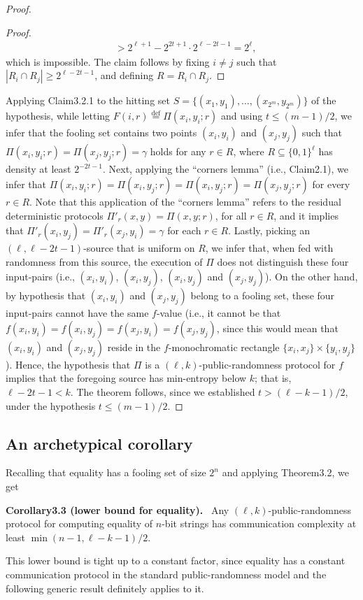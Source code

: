 \documentclass[10pt,a4paper]{article}
\newenvironment{authorclaim}[1]{\par\medskip\noindent\textbf{#1.}\ }{\par\medskip}
\begin{document}
\begin{proof}
\begin{proof}
\begin{align*}
&>2^{\ell+1}-2^{2t+1}\cdot2^{\ell-2t-1}=2^\ell,
\end{align*}
which is impossible. The claim follows by fixing $i\ne j$ such that $|R_i\cap R_j|\ge2^{\ell-2t-1}$, and defining $R=R_i\cap R_j$.
\end{proof}
Applying Claim3.2.1 to the hitting set $S=\{(x_1,y_1),\ldots,(x_{2^m},y_{2^m})\}$ of the hypothesis, while letting $F(i,r)\stackrel{\mathrm{def}}=\Pi(x_i,y_i;r)$ and using $t\le(m-1)/2$, we infer that the fooling set contains two points $(x_i,y_i)$ and $(x_j,y_j)$ such that $\Pi(x_i,y_i;r)=\Pi(x_j,y_j;r)=\gamma$ holds for any $r\in R$, where $R\subseteq\{0,1\}^\ell$ has density at least $2^{-2t-1}$.
Next, applying the ``corners lemma'' (i.e., Claim2.1), we infer that $\Pi(x_i,y_i;r)=\Pi(x_i,y_j;r)=\Pi(x_i,y_j;r)=\Pi(x_j,y_j;r)$ for every $r\in R$. Note that this application of the ``corners lemma'' refers to the residual deterministic protocols $\Pi'_r(x,y)=\Pi(x,y;r)$, for all $r\in R$, and it implies that $\Pi'_r(x_i,y_j)=\Pi'_r(x_j,y_i)=\gamma$ for each $r\in R$.
Lastly, picking an $(\ell,\ell-2t-1)$-source that is uniform on $R$, we infer that, when fed with randomness from this source, the execution of $\Pi$ does not distinguish these four input-pairs (i.e., $(x_i,y_i)$, $(x_i,y_j)$, $(x_i,y_j)$ and $(x_j,y_j)$). On the other hand, by hypothesis that $(x_i,y_i)$ and $(x_j,y_j)$ belong to a fooling set, these four input-pairs cannot have the same $f$-value (i.e., it cannot be that $f(x_i,y_i)=f(x_i,y_j)=f(x_j,y_i)=f(x_j,y_j)$, since this would mean that $(x_i,y_i)$ and $(x_j,y_j)$ reside in the $f$-monochromatic rectangle $\{x_i,x_j\}\times\{y_i,y_j\}$). Hence, the hypothesis that $\Pi$ is a $(\ell,k)$-public-randomness protocol for $f$ implies that the foregoing source has min-entropy below $k$; that is, $\ell-2t-1<k$. The theorem follows, since we established $t>(\ell-k-1)/2$, under the hypothesis $t\le(m-1)/2$.
\end{proof}
\subsection*{An archetypical corollary}
Recalling that equality has a fooling set of size $2^n$ and applying Theorem3.2, we get
\begin{authorclaim}{Corollary3.3 (lower bound for equality)}
Any $(\ell,k)$-public-randomness protocol for computing equality of $n$-bit strings has communication complexity at least $\min(n-1,\ell-k-1)/2$.
\end{authorclaim}
This lower bound is tight up to a constant factor, since equality has a constant communication protocol in the standard public-randomness model and the following generic result definitely applies to it.
\end{document}
